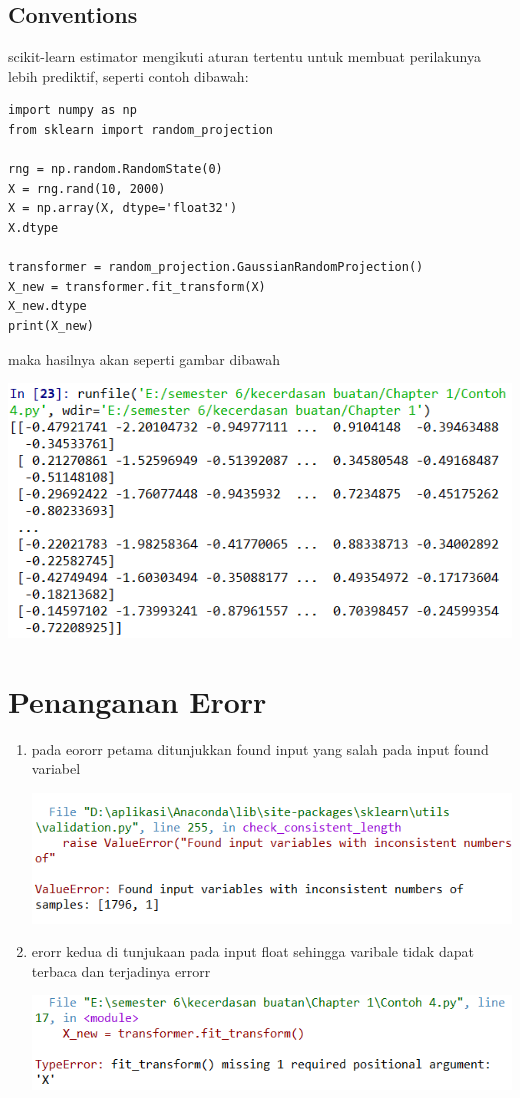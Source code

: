 \documentclass{homework}
\begin{document}
\subsection{Conventions}
scikit-learn estimator mengikuti aturan tertentu untuk membuat perilakunya lebih prediktif,
seperti contoh dibawah:

\begin{verbatim}
import numpy as np
from sklearn import random_projection

rng = np.random.RandomState(0)
X = rng.rand(10, 2000)
X = np.array(X, dtype='float32')
X.dtype

transformer = random_projection.GaussianRandomProjection()
X_new = transformer.fit_transform(X)
X_new.dtype
print(X_new)
\end{verbatim}
maka hasilnya akan seperti gambar dibawah
\begin{center}
    \includegraphics[width=.8\textwidth]{figures/1184100/hasil4.PNG}
\end{center}

\section{Penanganan Erorr}

\begin{enumerate}
    \item pada eororr petama ditunjukkan found input yang salah pada input found variabel
\begin{center}
    \includegraphics[width=.8\textwidth]{figures/1184100/erorr1.PNG}
\end{center}    
    \item erorr kedua di tunjukaan pada input float sehingga varibale tidak dapat terbaca dan terjadinya errorr
\begin{center}
    \includegraphics[width=.8\textwidth]{figures/1184100/erorr2.PNG}
\end{center} 
\end{enumerate}
\end{document}
